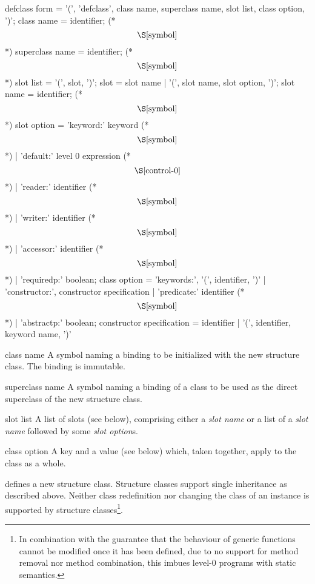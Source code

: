 \begin{optDefinition}
\label{defclass}
\Syntax
\savesyntax{}\vbox{\syntax
defclass form
   = '(', 'defclass', class name, superclass name,
     slot list, {class option}, ')';
class name
   = identifier; (* \[\S\ref{symbol}\] *)
superclass name
   = identifier; (* \[\S\ref{symbol}\] *)
slot list
   = '(', {slot}, ')';
slot
   = slot name
   | '(', slot name, {slot option}, ')';
slot name
   = identifier; (* \[\S\ref{symbol}\] *)
slot option
   = 'keyword:' keyword (* \[\S\ref{symbol}\] *)
   | 'default:' level 0 expression (* \[\S\ref{control-0}\] *)
   | 'reader:' identifier (* \[\S\ref{symbol}\] *)
   | 'writer:' identifier (* \[\S\ref{symbol}\] *)
   | 'accessor:' identifier (* \[\S\ref{symbol}\] *)
   | 'requiredp:' boolean;
class option
   = 'keywords:', '(', {identifier}, ')'
   | 'constructor:', constructor specification
   | 'predicate:' identifier (* \[\S\ref{symbol}\] *)
   | 'abstractp:' boolean;
constructor specification
   = identifier
   | '(', identifier, {keyword name}, ')'
\endsyntax}
\label{defclass-syntax-table}

\begin{arguments}
    \item[class name] A symbol naming a binding to be initialized with the new
    structure class. The binding is immutable.

    \item[superclass name] A symbol naming a binding of a class to be used as
    the direct superclass of the new structure class.

    \item[slot list] A list of slots (see below), comprising either a {\em slot
        name} or a list of a {\em slot name} followed by some {\em slot
        option}s.

    \item[class option] A key and a value (see below) which, taken together,
    apply to the class as a whole.
\end{arguments}
%
\remarks%
 defines a new structure class. Structure classes support
single inheritance as described above. Neither class redefinition nor changing
the class of an instance is supported by structure classes\footnote{In
    combination with the guarantee that the behaviour of generic functions
    cannot be modified once it has been defined, due to no support for method
    removal nor method combination, this imbues level-0 programs with static
    semantics.}.


\end{optDefinition}
